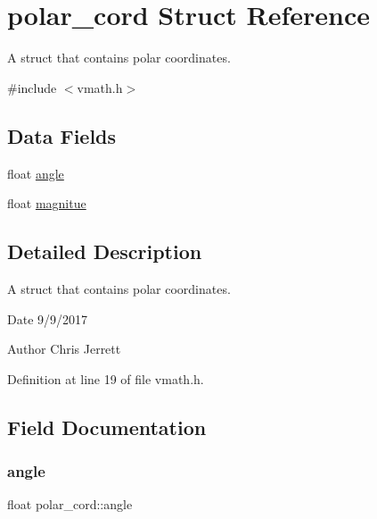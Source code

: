\hypertarget{structpolar__cord}{}\section{polar\+\_\+cord Struct Reference}
\label{structpolar__cord}


A struct that contains polar coordinates.  




{\ttfamily \#include $<$vmath.\+h$>$}

\subsection*{Data Fields}
\begin{DoxyCompactItemize}
\item 
float \hyperlink{structpolar__cord_a81b3a11d38d76719b02fcd425adaa216}{angle}
\item 
float \hyperlink{structpolar__cord_aec2e25fecc82af176f0fcd23f1e02f0c}{magnitue}
\end{DoxyCompactItemize}


\subsection{Detailed Description}
A struct that contains polar coordinates. 

\begin{DoxyDate}{Date}
9/9/2017 
\end{DoxyDate}
\begin{DoxyAuthor}{Author}
Chris Jerrett 
\end{DoxyAuthor}


Definition at line 19 of file vmath.\+h.



\subsection{Field Documentation}
\mbox{\label{structpolar__cord_a81b3a11d38d76719b02fcd425adaa216}} 
\subsubsection{\texorpdfstring{angle}{angle}}
{\footnotesize\ttfamily float polar\+\_\+cord\+::angle}

